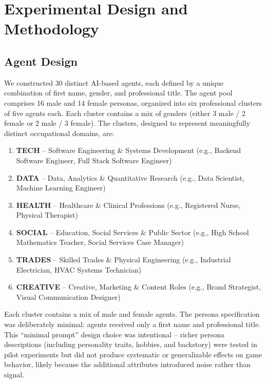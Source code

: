 \documentclass[12pt]{article}
\begin{document}
\section{Experimental Design and Methodology}

\subsection{Agent Design}

We constructed 30 distinct AI-based agents, each defined by a unique combination of first name, gender, and professional title. The agent pool comprises 16 male and 14 female personas, organized into six professional clusters of five agents each. Each cluster contains a mix of genders (either 3 male / 2 female or 2 male / 3 female). The clusters, designed to represent meaningfully distinct occupational domains, are:

\begin{enumerate}
    \item \textbf{TECH} -- Software Engineering \& Systems Development (e.g., Backend Software Engineer, Full Stack Software Engineer)
    \item \textbf{DATA} -- Data, Analytics \& Quantitative Research (e.g., Data Scientist, Machine Learning Engineer)
    \item \textbf{HEALTH} -- Healthcare \& Clinical Professions (e.g., Registered Nurse, Physical Therapist)
    \item \textbf{SOCIAL} -- Education, Social Services \& Public Sector (e.g., High School Mathematics Teacher, Social Services Case Manager)
    \item \textbf{TRADES} -- Skilled Trades \& Physical Engineering (e.g., Industrial Electrician, HVAC Systems Technician)
    \item \textbf{CREATIVE} -- Creative, Marketing \& Content Roles (e.g., Brand Strategist, Visual Communication Designer)
\end{enumerate}

Each cluster contains a mix of male and female agents. The persona specification was deliberately minimal: agents received only a first name and professional title. This ``minimal prompt'' design choice was intentional -- richer persona descriptions (including personality traits, hobbies, and backstory) were tested in pilot experiments but did not produce systematic or generalizable effects on game behavior, likely because the additional attributes introduced noise rather than signal.
\end{document}
